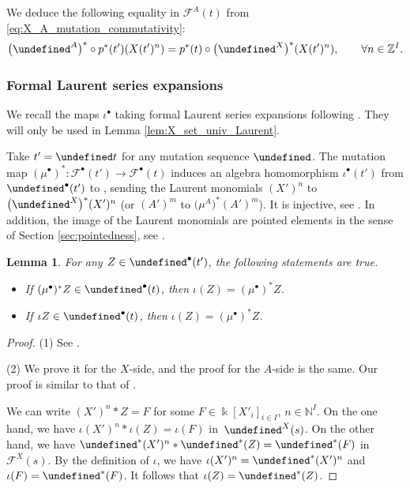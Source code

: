 \documentclass[10pt,a4paper]{amsart}
\newcommand{\kk}{\Bbbk}
\newcommand{\Z}{\mathbb{Z}}
\newcommand{\N}{\mathbb{N}}
\newcommand{\cF}{{\mathcal F}}
\let\LP\undefined
\let\seq\undefined
\let\hLP\undefined
\newcommand{\LP}{{\mathcal{LP}}}
\newcommand{\seq}{\boldsymbol{\mu}}%
\newcommand{\hLP}{\widehat{\mathcal{LP}}}
\numberwithin{equation}{section}
\newtheorem{Lemma}[Theorem]{Lemma}
\begin{document}
We deduce the following equality in $\cF^A(t)$ from \eqref{eq:X_A_mutation_commutativity}:
\begin{align}\label{eq:X_A_mutation_seq_comm}
 \big(\seq^A\big)^*\circ p^*(t')(X(t')^n)=p^*(t)\circ \big(\seq^X\big)^*(X(t')^n),\qquad \forall n\in \Z^I.
\end{align}


\subsubsection*{Formal Laurent series expansions}
We recall the maps $\iota^\bullet$ taking formal Laurent series expansions following \cite[Section 3.3]{qin2019bases}. They will only be used in Lemma \ref{lem:X_set_univ_Laurent}.

Take $t'=\seq t$ for any mutation sequence $\seq$. The mutation map $(\mu^\bullet)^*\colon \cF^\bullet(t')\rightarrow \cF^\bullet(t)$ induces an algebra homomorphism $\iota^\bullet(t')$ from $\LP^\bullet(t')$ to \smash{$\hLP^\bullet(t)$}, sending the Laurent monomials $(X')^n$ to $\big(\seq^X\big)^*(X')^n$ \big(or $(A')^m$ to $\big(\mu^A\big)^* (A')^m$\big). It is injective, see \cite[Lemma 3.3.7\,(1)]{qin2019bases}. In addition, the image of the Laurent monomials are pointed elements in the sense of Section \ref{sec:pointedness}, see \cite[Lemma 3.3.6]{qin2019bases}.
\begin{Lemma}
 For any $Z\in \LP^\bullet(t')$, the following statements are true.
\begin{itemize}\itemsep=0pt
\item[$(1)$] If $(\mu^\bullet)^* Z\in \LP^\bullet(t)$, then $\iota(Z)=(\mu^\bullet)^* Z$.
\item[$(2)$] If $\iota Z\in \LP^\bullet(t)$, then $\iota(Z)=(\mu^\bullet)^* Z$.
\end{itemize}
\end{Lemma}
\begin{proof}
 (1) See \cite[Lemma 3.3.7\,(2)]{qin2019bases}.

 (2) We prove it for the $X$-side, and the proof for the $A$-side is the same. Our proof is similar to that of \cite[Lemma 3.3.7\,(2)]{qin2019bases}.

 We can write $(X')^n * Z= F$ for some $F\in \kk[X'_i]_{i\in I}$, $n\in \N^I$. On the one hand, we have $\iota(X')^n* \iota(Z)=\iota(F)$ in~$\LP^X(s)$. On the other hand, we have $\seq^*(X')^n* \seq^*(Z)=\seq^*(F)$ in~$\cF^X(s)$. By the definition of $\iota$, we have $\iota(X')^n=\seq^*(X')^n$ and $\iota(F)=\seq^*(F)$. It follows that $\iota(Z)=\seq^*(Z)$.
\end{proof}
\end{document}
